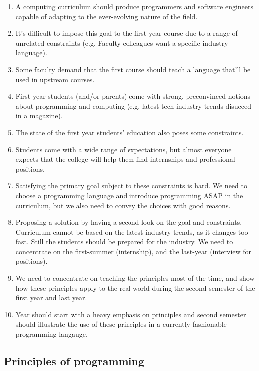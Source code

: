 \documentclass{article}
\begin{document}
\begin{enumerate}
\item A computing curriculum should produce programmers and software
  engineers capable of adapting to the ever-evolving nature of the
  field.
\item It's difficult to impose this goal to the first-year course due
  to a range of unrelated constraints (e.g. Faculty colleagues want a
  specific industry language).
\item Some faculty demand that the first course should teach a
  language that'll be used in upstream courses.
\item First-year students (and/or parents) come with strong,
  preconvinced notions about programming and computing (e.g. latest
  tech industry trends disucced in a magazine).
\item The state of the first year students' education also poses some
  constraints.
\item Students come with a wide range of expectations, but almost
  everyone expects that the college will help them find internships
  and professional positions.
\item Satisfying the primary goal subject to these constraints is
  hard. We need to choose a programming language and introduce
  programming ASAP in the curriculum, but we also need to convey the
  choices with good reasons.
\item Proposing a solution by having a second look on the goal and
  constraints. Curriculum cannot be based on the latest industry
  trends, as it changes too fast. Still the students should be
  prepared for the industry. We need to concentrate on the
  first-summer (internship), and the last-year (interview for
  positions).
\item We need to concentrate on teaching the principles most of the
  time, and show how these principles apply to the real world during
  the second semester of the first year and last year.
\item Year should start with a heavy emphasis on principles and second
  semester should illustrate the use of these principles in a
  currently fashionable programming langauge.
\end{enumerate}

\subsection{Principles of programming}
\end{document}

